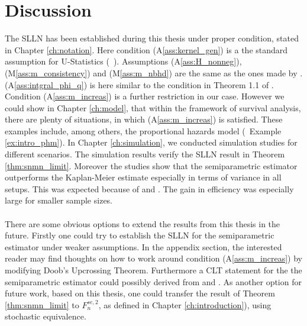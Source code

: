 \chapter{Discussion}
%
The SLLN has been established during this thesis under proper condition, stated in Chapter \ref{ch:notation}. Here condition (A\ref{ass:kernel_gen}) is a the standard assumption for U-Statistics (\cf\ \cite{lee1990u}). Assumptions (A\ref{ass:H_nonneg}), (M\ref{ass:m_consistency}) and (M\ref{ass:m_nbhd}) are the same as the ones made by \cite{dikta2000strong}. (A\ref{ass:intgral_phi_q}) is here similar to the condition in Theorem 1.1 of \cite{dikta2000strong}. Condition (A\ref{ass:m_increas}) is a further restriction in our case. However we could show in Chapter \ref{ch:model}, that within the framework of survival analysis, there are plenty of situations, in which (A\ref{ass:m_increas}) is satisfied. These examples include, among others, the proportional hazards model (\cf\ Example \ref{ex:intro_phm}). In Chapter \ref{ch:simulation}, we conducted simulation studies for different scenarios. The simulation results verify the SLLN result in Theorem \ref{thm:snmn_limit}. Moreover the studies show that the semiparametric estimator outperforms the Kaplan-Meier estimate especially in terms of variance in all setups. This was expected because of \cite{dikta2005central} and \cite{dikta2014efficient}. The gain in efficiency was especially large for smaller sample sizes.\\
\\
There are some obvious options to extend the results from this thesis in the future. Firstly one could try to establish the SLLN for the semiparametric estimator under weaker assumptions. In the appendix section, the interested reader may find thoughts on how to work around condition (A\ref{ass:m_increas}) by modifying Doob's Upcrossing Theorem. Furthermore a CLT statement for the the semiparametric estimator could possibly derived from \cite{dikta2005central} and \cite{bose2002asymptotic}. As another option for future work, based on this thesis, one could transfer the result of Theorem \ref{thm:snmn_limit} to $F_n^{se,2}$, as defined in Chapter \ref{ch:introduction}), using stochastic equivalence. 